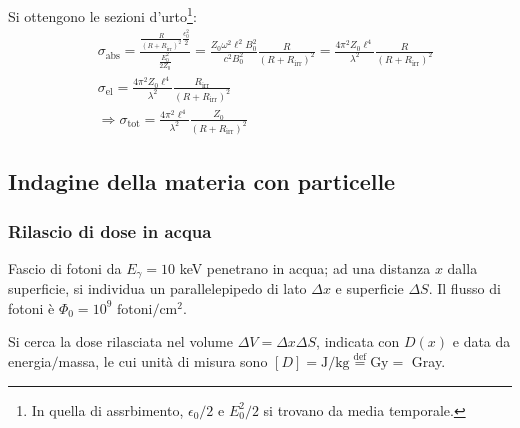 \documentclass[10pt, a4paper]{scrartcl}
\numberwithin{equation}{subsection}
\theoremstyle{style1}
\begin{document}
\noindent Si ottengono le sezioni d'urto\footnote{In quella di assrbimento, $\epsilon_0 / 2$ e $E_0^2 / 2$ si trovano da media temporale.}:
\begin{equation}
	\begin{split}
		&\sigma _\text{abs}=\frac{\frac{R}{(R+R_\text{irr})^2} \frac{\epsilon_0^2}{2}}{\frac{E_0^2}{2Z_0}}= \frac{Z_0 \omega^2 \ell ^2 B_0^2}{c^2 B_0^2} \frac{R}{(R+R_\text{irr})^2} = \frac{4\pi^2 Z_0 \ell ^4}{\lambda ^2} \frac{R}{(R+R_\text{irr})^2}\\
		& \sigma _\text{el}= \frac{4\pi^2 Z_0\ell ^4}{\lambda ^2} \frac{R_\text{irr}}{(R+R_\text{irr})^2}\\
		&\Rightarrow \sigma _\text{tot}= \frac{4\pi^2 \ell ^4}{\lambda ^2} \frac{Z_0}{(R+R_\text{irr})^2}
	\end{split}
\end{equation}

\newpage
\subsection{Indagine della materia con particelle}
\subsubsection{Rilascio di dose in acqua}
Fascio di fotoni da $E_\gamma = 10$ keV penetrano in acqua; ad una distanza $x$ dalla superficie, si individua un parallelepipedo di lato $\Delta x$ e superficie $\Delta S$. Il flusso di fotoni \`e $\Phi_0 = 10^9 \text{ fotoni}/\text{cm}^2$.

Si cerca la dose rilasciata nel volume $\Delta V = \Delta x \Delta S$, indicata con $D(x)$ e data da energia$/$massa, le cui unit\`a di misura sono $\left[ D \right] = \text{J}/\text{kg} \overset{\text{def}}{=} \text{Gy}=$ Gray.
\end{document}
